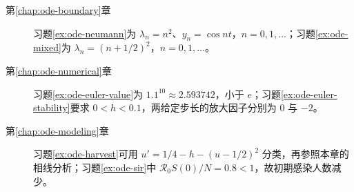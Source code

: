 \begin{description}
 \item[第\ref{chap:ode-boundary}章] 习题\ref{ex:ode-neumann}为 $\lambda_n=n^2$、$y_n=\cos nt$，$n=0,1,\ldots$；习题\ref{ex:ode-mixed}为 $\lambda_n=(n+1/2)^2$，$n=0,1,\ldots$。
 \item[第\ref{chap:ode-numerical}章] 习题\ref{ex:ode-euler-value}为 $1.1^{10}\approx2.593742$，小于 $e$；习题\ref{ex:ode-euler-stability}要求 $0<h<0.1$，两给定步长的放大因子分别为 $0$ 与 $-2$。
 \item[第\ref{chap:ode-modeling}章] 习题\ref{ex:ode-harvest}可用 $u'=1/4-h-(u-1/2)^2$ 分类，再参照本章的相线分析；习题\ref{ex:ode-sir}中 $\mathcal R_0S(0)/N=0.8<1$，故初期感染人数减少。
\end{description}

